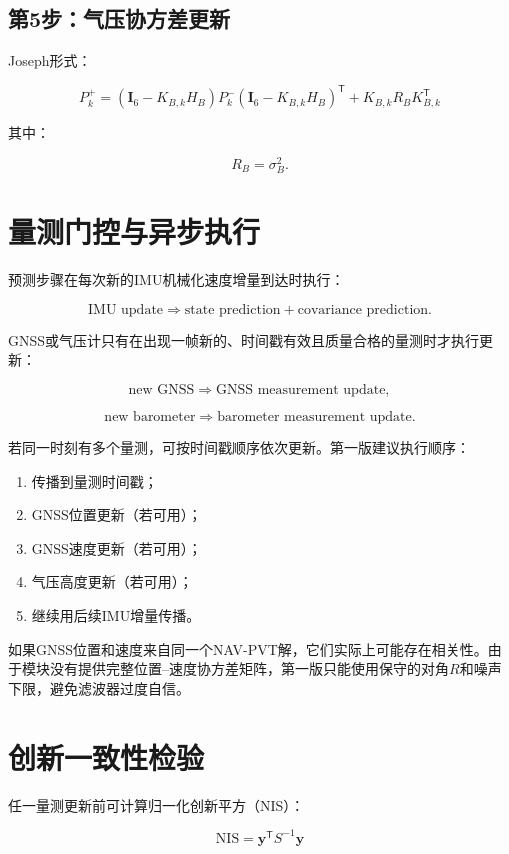 \documentclass[12pt,a4paper]{ctexart}
\newcommand{\I}{\mathbf I}
\newcommand{\transpose}{^{\mathsf T}}
\begin{document}
\subsection*{第5步：气压协方差更新}

Joseph形式：

\[
\boxed{
P_k^+
=
(\I_6-K_{B,k}H_B)
P_k^-
(\I_6-K_{B,k}H_B)\transpose
+
K_{B,k}R_BK_{B,k}\transpose
}
\]

其中：

\[
R_B=\sigma_B^2.
\]

\section{量测门控与异步执行}

预测步骤在每次新的IMU机械化速度增量到达时执行：

\[
\text{IMU update}
\Longrightarrow
\text{state prediction}
+
\text{covariance prediction}.
\]

GNSS或气压计只有在出现一帧新的、时间戳有效且质量合格的量测时才执行更新：

\[
\text{new GNSS}
\Longrightarrow
\text{GNSS measurement update},
\]

\[
\text{new barometer}
\Longrightarrow
\text{barometer measurement update}.
\]

若同一时刻有多个量测，可按时间戳顺序依次更新。第一版建议执行顺序：

\begin{enumerate}[leftmargin=2em]
  \item 传播到量测时间戳；
  \item GNSS位置更新（若可用）；
  \item GNSS速度更新（若可用）；
  \item 气压高度更新（若可用）；
  \item 继续用后续IMU增量传播。
\end{enumerate}

如果GNSS位置和速度来自同一个NAV-PVT解，它们实际上可能存在相关性。由于模块没有提供完整位置--速度协方差矩阵，第一版只能使用保守的对角$R$和噪声下限，避免滤波器过度自信。

\section{创新一致性检验}

任一量测更新前可计算归一化创新平方（NIS）：

\[
\boxed{
\mathrm{NIS}
=
\mathbf y\transpose S^{-1}\mathbf y
}
\]
\end{document}

